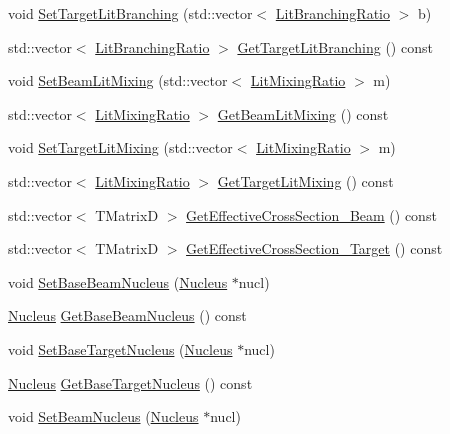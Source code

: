 \begin{DoxyCompactItemize}
\item 
void \hyperlink{classCoulExSimFitter_aa8cbab1305bd8427eb0087841b42af07}{Set\-Target\-Lit\-Branching} (std\-::vector$<$ \hyperlink{classLitBranchingRatio}{Lit\-Branching\-Ratio} $>$ b)
\item 
std\-::vector$<$ \hyperlink{classLitBranchingRatio}{Lit\-Branching\-Ratio} $>$ \hyperlink{classCoulExSimFitter_a453dae7b194c1fb8d26b508719c7a6bf}{Get\-Target\-Lit\-Branching} () const 
\item 
void \hyperlink{classCoulExSimFitter_a704084e639512c8aa7c33dac939729b7}{Set\-Beam\-Lit\-Mixing} (std\-::vector$<$ \hyperlink{classLitMixingRatio}{Lit\-Mixing\-Ratio} $>$ m)
\item 
std\-::vector$<$ \hyperlink{classLitMixingRatio}{Lit\-Mixing\-Ratio} $>$ \hyperlink{classCoulExSimFitter_a819e4a179cced909c7947d25749df0c4}{Get\-Beam\-Lit\-Mixing} () const 
\item 
void \hyperlink{classCoulExSimFitter_a1a1b81c10927ccf088de83d53c60a97e}{Set\-Target\-Lit\-Mixing} (std\-::vector$<$ \hyperlink{classLitMixingRatio}{Lit\-Mixing\-Ratio} $>$ m)
\item 
std\-::vector$<$ \hyperlink{classLitMixingRatio}{Lit\-Mixing\-Ratio} $>$ \hyperlink{classCoulExSimFitter_af28a9a7e25758f41f1e766df60626cea}{Get\-Target\-Lit\-Mixing} () const 
\item 
std\-::vector$<$ T\-Matrix\-D $>$ \hyperlink{classCoulExSimFitter_aa5113d708b9c44717998ef6f81c4a8a7}{Get\-Effective\-Cross\-Section\-\_\-\-Beam} () const 
\item 
std\-::vector$<$ T\-Matrix\-D $>$ \hyperlink{classCoulExSimFitter_ac6e6047ad8ac3a3201dfa742d829c66a}{Get\-Effective\-Cross\-Section\-\_\-\-Target} () const 
\item 
void \hyperlink{classCoulExSimFitter_a5f107c68537522704cfbea61406429e7}{Set\-Base\-Beam\-Nucleus} (\hyperlink{classNucleus}{Nucleus} $\ast$nucl)
\item 
\hyperlink{classNucleus}{Nucleus} \hyperlink{classCoulExSimFitter_aadd6ced090e569701768878ac944d1fb}{Get\-Base\-Beam\-Nucleus} () const 
\item 
void \hyperlink{classCoulExSimFitter_a97c35d0432333cefb1aeb256dc4e6ca8}{Set\-Base\-Target\-Nucleus} (\hyperlink{classNucleus}{Nucleus} $\ast$nucl)
\item 
\hyperlink{classNucleus}{Nucleus} \hyperlink{classCoulExSimFitter_a04f0ec899416e173065b282fcfd89796}{Get\-Base\-Target\-Nucleus} () const 
\item 
void \hyperlink{classCoulExSimFitter_aae95c6ebc60c00fb25b6466856ff4e92}{Set\-Beam\-Nucleus} (\hyperlink{classNucleus}{Nucleus} $\ast$nucl)

\end{DoxyCompactItemize}

